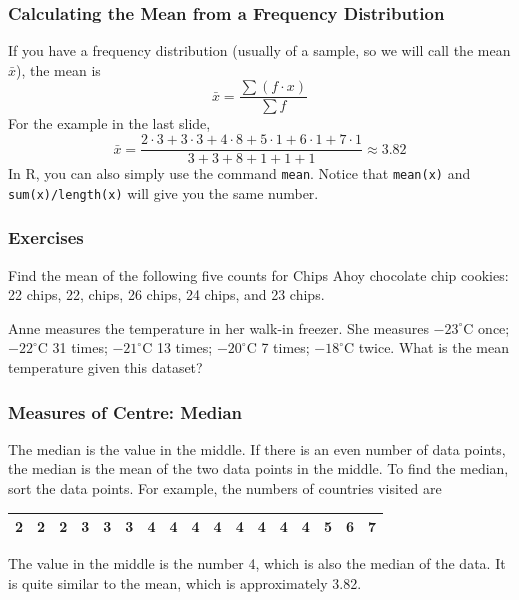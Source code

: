 \documentclass[xcolor=dvipsnames]{beamer}
\begin{document}
\begin{frame}
  \frametitle{Calculating the Mean from a Frequency Distribution}
If you have a frequency distribution (usually of a sample, so we will
call the mean $\bar{x}$), the mean is 
\begin{equation}
  \label{eq:eogheivi}
  \bar{x}=\frac{\sum{}\left(f\cdot{}x\right)}{\sum{}f}
\end{equation}
For the example in the last slide,
\begin{equation}
  \label{eq:uevuemoo}
  \bar{x}=\frac{2\cdot{}3+3\cdot{}3+4\cdot{}8+5\cdot{}1+6\cdot{}1+7\cdot{}1}{3+3+8+1+1+1}\approx{}3.82
\end{equation}
In R, you can also simply use the command \texttt{mean}. Notice that
\texttt{mean(x)} and \texttt{sum(x)/length(x)} will give you the same
number.
\end{frame}

\begin{frame}
  \frametitle{Exercises}
  {\ubung} Find the mean of the following five counts for Chips Ahoy
  chocolate chip cookies: 22 chips, 22, chips, 26 chips, 24 chips, and
  23 chips.

  \bigskip

  {\ubung} Anne measures the temperature in her walk-in freezer. She
  measures $-23^{\circ}$C once; $-22^{\circ}$C 31 times;
  $-21^{\circ}$C 13 times; $-20^{\circ}$C 7 times; $-18^{\circ}$C
  twice. What is the mean temperature given this dataset?
\end{frame}

\begin{frame}
  \frametitle{Measures of Centre: Median}
The median is the value in the middle. If there is an even number of
data points, the median is the mean of the two data points in the
middle. To find the median, sort the data points. For example, the
numbers of countries visited are

\medskip

\begin{tabular}{|c|c|c|c|c|c|c|c|c|c|c|c|c|c|c|c|c|}\hline
2&2&2&3&3&3&4&4&\alert{4}&4&4&4&4&4&5&6&7 \\ \hline
\end{tabular}

\medskip

The value in the middle is the number 4, which is also the median of
the data. It is quite similar to the mean, which is approximately 3.82.
\end{frame}
\end{document}
